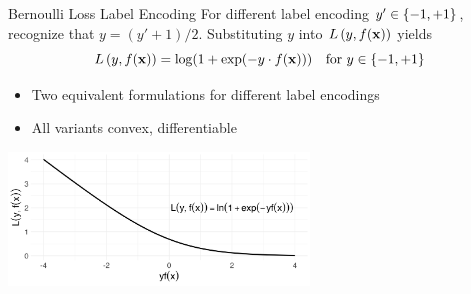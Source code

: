 \documentclass[11pt,compress,t,notes=noshow, xcolor=table]{beamer}
\begin{document}
\begin{vbframe}{Bernoulli Loss Label Encoding}
For different label encoding $y' \in \{-1, +1\}$, recognize that $y=(y'+1)/2$. Substituting $y$ into $L\left(y, f(\mathbf{x})\right)$ yields
\begin{equation*}
  L\left(y, f(\mathbf{x})\right) = \log(1+\exp(-y \cdot f(\mathbf{x}))) \quad \text{for } y \in \{-1, +1\}
\end{equation*}


\begin{itemize}
  \item Two equivalent formulations for different label encodings
  \item All variants convex, differentiable
\end{itemize}

\vspace{0.2cm}
\begin{center}
\includegraphics[width = 8cm]{figure/bernoulli_margin.png}
\end{center}

\end{vbframe}
\end{document}
